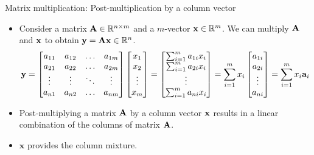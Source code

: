 \documentclass[aspectratio=169]{beamer}
\let\olditem\item
\renewcommand{\item}{\setlength{\itemsep}{\fill}\olditem}
\def\mf{\ensuremath\mathbf}
\begin{document}
\begin{frame}[t]{Matrix multiplication: Post-multiplication by a column vector}
\begin{itemize}
\item Consider a matrix $\mf{A} \in \mathbb{R}^{n \times m}$ and a $m$-vector $\mf{x} \in \mathbb{R}^m$. We can multiply $\mf{A}$ and $\mf{x}$ to obtain $\mf{y} = \mf{A}\mf{x} \in \mathbb{R}^n$.
\[ \mf{y} = \begin{bmatrix}
a_{11} & a_{12} & \ldots & a_{1m} \\
a_{21} & a_{22} & \ldots & a_{2m} \\
\vdots & \vdots & \ddots & \vdots \\
a_{n1} & a_{n2} & \ldots & a_{nm} \\
\end{bmatrix}\begin{bmatrix}
x_1\\ x_2 \\ \vdots \\ x_{m}
\end{bmatrix} = \begin{bmatrix}
\sum_{i=1}^ma_{1i}x_i\\ \sum_{i=1}^ma_{2i}x_i \\ \vdots \\ \sum_{i=1}^ma_{ni}x_i
\end{bmatrix} = \sum_{i=1}^mx_i\begin{bmatrix}
a_{1i} \\ a_{2i} \\ \vdots \\ a_{ni}
\end{bmatrix} = \sum_{i=1}^mx_i \mathbf{a}_{i} \]
\item Post-multiplying a matrix $\mf{A}$ by a column vector $\mf{x}$ results in a linear combination of the columns of matrix $\mf{A}$.

\item $\mathbf{x}$ provides the column mixture.
\end{itemize}
\end{frame}
\end{document}
